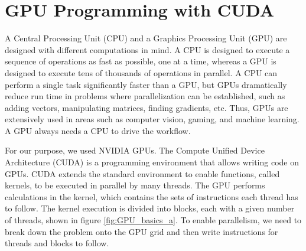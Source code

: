 \section{GPU Programming with CUDA {\cpp} }
A Central Processing Unit (CPU) and a Graphics Processing Unit (GPU) are designed with different computations in mind. A CPU is designed to execute a sequence of operations as fast as possible, one at a time, whereas a GPU is designed to execute tens of thousands of operations in parallel. A CPU can perform a single task significantly faster than a GPU, but GPUs dramatically reduce run time in problems where parallelization can be established, such as adding vectors, manipulating matrices, finding gradients, etc. Thus, GPUs are extensively used in areas such as computer vision, gaming, and machine learning. A GPU always needs a CPU to drive the workflow. 

For our purpose, we used NVIDIA GPUs. The Compute Unified Device Architecture (CUDA) is a programming environment that allows writing {\cpp} code on GPUs. CUDA extends the standard {\cpp} environment to enable functions, called kernels, to be executed in parallel by many threads. The GPU performs calculations in the kernel, which contains the sets of instructions each thread has to follow. The kernel execution is divided into blocks, each with a given number of threads, shown in figure \ref{fig:GPU_basics_a}. To enable parallelism, we need to break down the problem onto the GPU grid and then write instructions for threads and blocks to follow.

